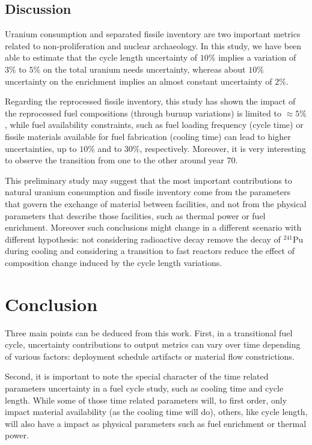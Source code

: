 \documentclass{anstrans}
\begin{document}
\subsection{Discussion}

Uranium consumption and separated fissile inventory are two important metrics
related to non-proliferation and nuclear archaeology.  In this study, we have
been able to estimate that the cycle length uncertainty of $10\%$ implies a
variation of $3\%$ to $5\%$ on the total uranium needs uncertainty, whereas about
$10\%$ uncertainty on the enrichment implies an almost constant uncertainty of $2\%$.

Regarding the reprocessed fissile inventory, this study has shown the impact of
the reprocessed fuel compositions (through burnup variations) is limited to
$\approx5\%$, while fuel availability constraints, such as fuel loading
frequency (cycle time) or fissile materials available for fuel fabrication
(cooling time) can lead to higher uncertainties, up to $10\%$ and to $30\%$,
respectively.  Moreover, it is very interesting to observe the transition from
one to the other around year 70.

This preliminary study may suggest that the most important contributions to
natural uranium consumption and fissile inventory come from the parameters that
govern the exchange of material between facilities, and not from the physical
parameters that describe those facilities, such as thermal power or fuel
enrichment. Moreover such conclusions might change in a different scenario with
different hypothesis: not considering radioactive decay remove the decay of
$^{241}$Pu during cooling and considering a transition to fast reactors reduce
the effect of composition change induced by the cycle length variations.

\section{Conclusion}

Three main points can be deduced from this work.  First, in a transitional fuel
cycle, uncertainty contributions to output metrics can vary over time depending
of various factors: deployment schedule artifacts or material flow
constrictions.

Second, it is important to note the special character of the time related
parameters uncertainty in a fuel cycle study, such as cooling time and cycle
length.  While some of those time related parameters will, to first order, only
impact material availability (as the cooling time will do), others, like cycle
length, will also have a impact as physical parameters such as fuel enrichment
or thermal power.  
\end{document}
